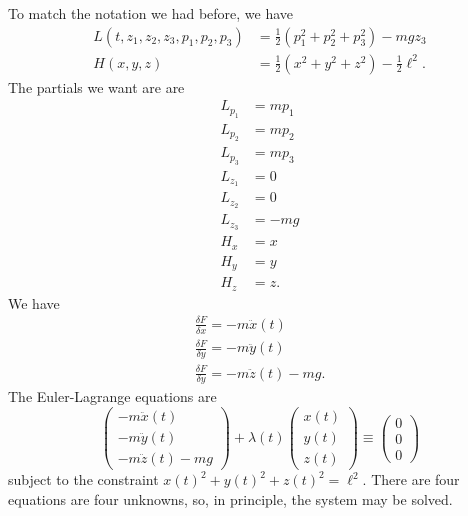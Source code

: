 \documentclass[11pt]{book}
\begin{document}
\begin{enumerate}
To match the notation we had before, we have
\begin{align*}
L(t, z_1,z_2,z_3, p_1,p_2,p_3) &= \frac{1}{2} (p_1^2 + p_2^2 + p_3^2) - mgz_3 \\
H(x,y,z) &= \frac{1}{2} (x^2+y^2+z^2) - \frac{1}{2} \ell^2.
\end{align*}
The partials we want are are
\begin{align*}
L_{p_1} &= mp_1 \\
L_{p_2} &= mp_2 \\
L_{p_3} &= mp_3 \\
L_{z_1} &= 0 \\
L_{z_2} &= 0 \\
L_{z_3} &= -mg \\
H_x &= x \\
H_y &= y \\
H_z &= z.
\end{align*}
We have
\begin{align*}
\frac{\delta F}{\delta x} = -m \ddot{x}(t) \\
\frac{\delta F}{\delta y} = -m \ddot{y}(t) \\
\frac{\delta F}{\delta y} = -m \ddot{z}(t) - mg.
\end{align*}
The Euler-Lagrange equations are
\[
\begin{pmatrix}
-m \ddot{x}(t) \\
-m \ddot{y}(t) \\
-m \ddot{z}(t) - mg
\end{pmatrix} + \lambda (t) \begin{pmatrix}
x(t) \\ y(t) \\ z(t)
\end{pmatrix} \equiv \begin{pmatrix}
0 \\ 0 \\ 0
\end{pmatrix}
\]
subject to the constraint $x(t)^2 + y(t)^2 + z(t)^2 = \ell^2$. There are four equations are four unknowns, so, in principle, the system may be solved.


\end{enumerate}
\end{document}
